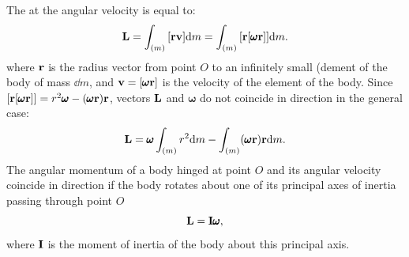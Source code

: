 \subsection{}\label{4.1.5} The  at the angular velocity is equal to:
\begin{equation*}%
\vb{L} = \int_{(m)} \qty[\vb{r}\vb{v}] \dd m = \int_{(m)} \qty[\vb{r}[\pmb{\omega}\vb{r}]] \dd m.
\end{equation*}
where $\vb{r}$ is the radius vector from point $O$ to an infinitely small (dement of the body of mass $\dd m$, and $\vb{v} = \qty[\pmb{\omega}\vb{r}]$ is the velocity of the element of the body. Since $\qty[\vb{r} \qty[\pmb{\omega}\vb{r}]] = r^{2}\pmb{\omega} - (\pmb{\omega}\vb{r}) \vb{r}$, vectors $\vb{L}$ and $\pmb{\omega}$ do not coincide in direction in the general case:
\begin{equation*}%
\vb{L} = \pmb{\omega} \int_{(m)} r^{2} \dd m - \int_{(m)} (\pmb{\omega}\vb{r}) \vb{r} \dd m.
\end{equation*}
The angular momentum of a body hinged at point $O$ and its angular velocity coincide in direction if the body rotates about one of its principal axes of inertia  passing through point $O$
\begin{equation*}%
\vb{L} = \vb{I} \pmb{\omega},
\end{equation*}
where $\vb{I}$ is the moment of inertia  of the body about this principal axis.
